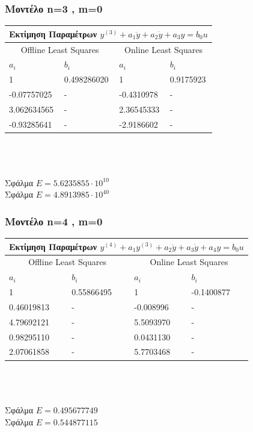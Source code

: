 \documentclass[12pt]{article}
\begin{document}
\subsubsection{Μοντέλο n=3 , m=0}
\begin{tabular}{ |p{2.5cm}|p{2.5cm}||p{2.5cm}|p{2.5cm}| }
\hline
\multicolumn{4}{|c|}{ Εκτίμηση Παραμέτρων  $y^{(3)}+a_1\ddot{y}+a_2\dot{y}+a_3 y= b_{0}u$}\\
\hline
\multicolumn{2}{|c||}{Offline Least Squares}&
\multicolumn{2}{|c|}{Online Least Squares }
\\
\hline
$ a_{i}$ & $b_i$ &$ a_{i}$ & $b_i$  \\
\hline
 1           & 0.498286020  &     1       & 0.9175923  \\
-0.07757025  & -            & -0.4310978  & - \\
3.062634565  & -            & 2.36545333  & - \\
-0.93285641  & -            & -2.9186602  & - \\
\hline
\end{tabular}
\\ \\\\
Σφάλμα $E=5.6235855 \cdot 10^{10}$ \\
Σφάλμα $E=4.8913985 \cdot 10^{40}$
\subsubsection{Μοντέλο n=4 , m=0}
\begin{tabular}{ |p{2.5cm}|p{2.5cm}||p{2.5cm}|p{2.5cm}| }
\hline
\multicolumn{4}{|c|}{ Εκτίμηση Παραμέτρων $y^{(4)}+a_1y^{(3)}+a_2\ddot{y}+a_3\dot{y}+a_4 y= b_{0}u$}\\
\hline
\multicolumn{2}{|c||}{Offline Least Squares}&
\multicolumn{2}{|c|}{Online Least Squares }
\\
\hline
$ a_{i}$ & $b_i$ &$ a_{i}$ & $b_i$  \\
\hline
 1         & 0.55866495    &     1      &  -0.1400877 \\
0.46019813  & -            & -0.008996  & - \\
4.79692121  & -            & 5.5093970  & - \\
0.98295110  & -            & 0.0431130  & - \\
2.07061858  & -            & 5.7703468  & - \\
\hline
\end{tabular}
\\ \\\\
Σφάλμα $E=0.495677749$\\
Σφάλμα $E=0.544877115$
\end{document}
